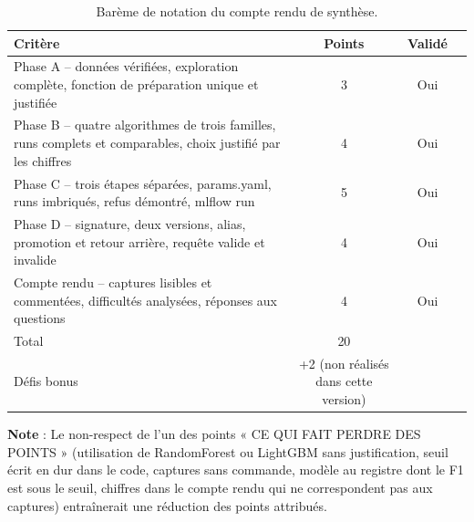 \documentclass[12pt,a4paper]{report}
\begin{document}
\begin{table}[h!]
    \centering
    \begin{tabular}{lccc}
        \toprule
        Critère & Points & Validé \\
        \midrule
        Phase A – données vérifiées, exploration complète, fonction de préparation unique et justifiée & 3 & Oui \\
        Phase B – quatre algorithmes de trois familles, runs complets et comparables, choix justifié par les chiffres & 4 & Oui \\
        Phase C – trois étapes séparées, params.yaml, runs imbriqués, refus démontré, mlflow run & 5 & Oui \\
        Phase D – signature, deux versions, alias, promotion et retour arrière, requête valide et invalide & 4 & Oui \\
        Compte rendu – captures lisibles et commentées, difficultés analysées, réponses aux questions & 4 & Oui \\
        Total & 20 & \\
        Défis bonus & +2 (non réalisés dans cette version) & \\
        \bottomrule
    \end{tabular}
\caption{Barème de notation du compte rendu de synthèse.}
\end{table}

\textbf{Note} : Le non-respect de l'un des points « CE QUI FAIT PERDRE DES POINTS » (utilisation de RandomForest ou LightGBM sans justification, seuil écrit en dur dans le code, captures sans commande, modèle au registre dont le F1 est sous le seuil, chiffres dans le compte rendu qui ne correspondent pas aux captures) entraînerait une réduction des points attribués.
\end{document}
